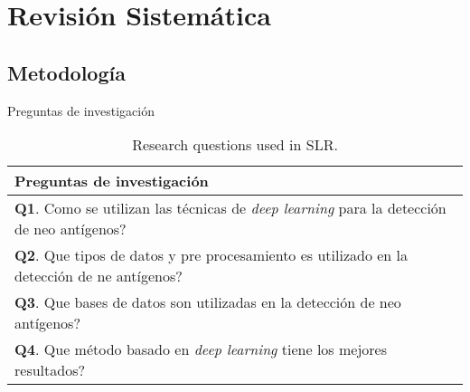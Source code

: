 \documentclass[10pt]{beamer}
\newcommand{\1}{
	\setbeamertemplate{background}{
		\texttt{[image: img/1]}
		\tikz[overlay] \fill[fill opacity=0.75,fill=white] (0,0) rectangle (-\paperwidth,\paperheight);
	}
}
\begin{document}
\section{Revisión Sistemática}


\subsection{Metodología}


\begin{frame}{Preguntas de investigación}{}
	
	\begin{table}[h]
		\begin{center}
			\caption{Research questions used in SLR.}
			\label{tab:questions}
			\setlength{\tabcolsep}{0.5em} %
			{\renewcommand{\arraystretch}{1.4}%
				\begin{tabular}{p{8.5cm}}
					\textbf{Preguntas de investigación} \\ \hline
					\textbf{Q1}. Como se utilizan las técnicas de \textit{deep learning} para la detección de neo antígenos?\\
					\textbf{Q2}. Que tipos de datos y pre procesamiento es utilizado en la detección de ne antígenos?\\
					\textbf{Q3}. Que bases de datos son utilizadas en la detección de neo antígenos?\\
					\textbf{Q4}. Que método basado en \textit{deep learning} tiene los mejores resultados?   \\		
				\end{tabular}
			}
		\end{center}
	\end{table}

\end{frame}
\end{document}
